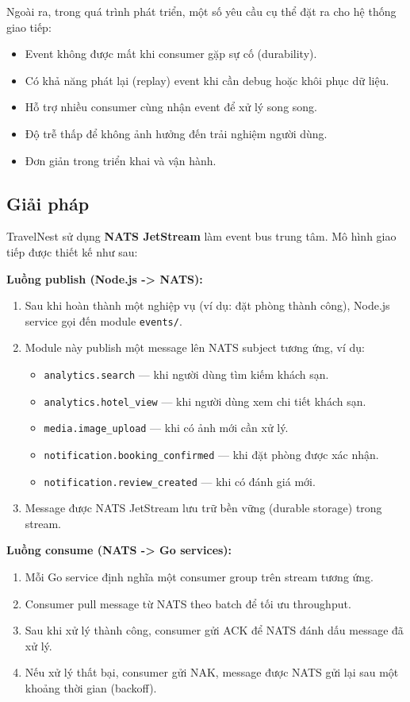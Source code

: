 \documentclass[13pt,a4paper,twoside]{report}
\begin{document}
Ngoài ra, trong quá trình phát triển, một số yêu cầu cụ thể đặt ra cho hệ thống giao tiếp:
\begin{itemize}
  \item Event không được mất khi consumer gặp sự cố (durability).
  \item Có khả năng phát lại (replay) event khi cần debug hoặc khôi phục dữ liệu.
  \item Hỗ trợ nhiều consumer cùng nhận event để xử lý song song.
  \item Độ trễ thấp để không ảnh hưởng đến trải nghiệm người dùng.
  \item Đơn giản trong triển khai và vận hành.
\end{itemize}

\subsection{Giải pháp}

TravelNest sử dụng \textbf{NATS JetStream} làm event bus trung tâm. Mô hình giao tiếp được thiết kế như sau:

\textbf{Luồng publish (Node.js -> NATS):}
\begin{enumerate}
  \item Sau khi hoàn thành một nghiệp vụ (ví dụ: đặt phòng thành công), Node.js service gọi đến module \texttt{events/}.
  \item Module này publish một message lên NATS subject tương ứng, ví dụ:
  \begin{itemize}
    \item \texttt{analytics.search} --- khi người dùng tìm kiếm khách sạn.
    \item \texttt{analytics.hotel\_view} --- khi người dùng xem chi tiết khách sạn.
    \item \texttt{media.image\_upload} --- khi có ảnh mới cần xử lý.
    \item \texttt{notification.booking\_confirmed} --- khi đặt phòng được xác nhận.
    \item \texttt{notification.review\_created} --- khi có đánh giá mới.
  \end{itemize}
  \item Message được NATS JetStream lưu trữ bền vững (durable storage) trong stream.
\end{enumerate}

\textbf{Luồng consume (NATS -> Go services):}
\begin{enumerate}
  \item Mỗi Go service định nghĩa một consumer group trên stream tương ứng.
  \item Consumer pull message từ NATS theo batch để tối ưu throughput.
  \item Sau khi xử lý thành công, consumer gửi ACK để NATS đánh dấu message đã xử lý.
  \item Nếu xử lý thất bại, consumer gửi NAK, message được NATS gửi lại sau một khoảng thời gian (backoff).
\end{enumerate}
\end{document}
